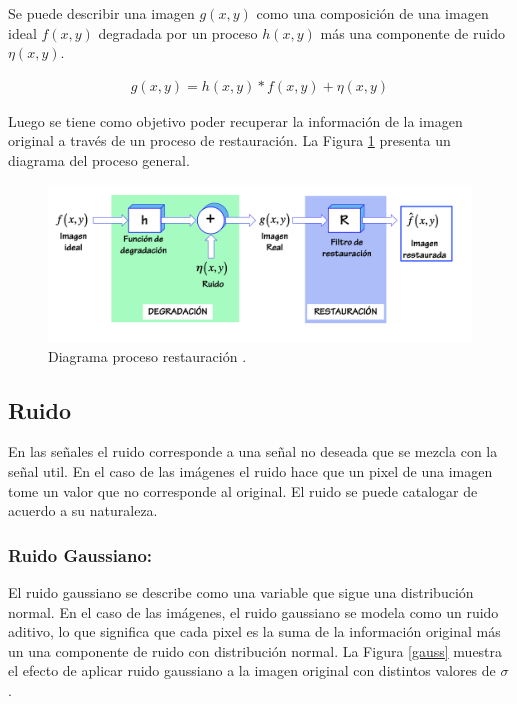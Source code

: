 \documentclass[
  letterpaper,
  twocolumn,
  9pt,
  journal,
  final]{IEEEtran}
\begin{document}
Se puede describir una imagen $g(x,y)$ como una composición de una imagen ideal $f(x,y)$ degradada por un proceso $h(x,y)$ más una componente de ruido $\eta(x,y)$.

\begin{align}
  g(x,y) = h(x, y) * f(x,y) + \eta(x,y)
\end{align}

Luego se tiene como objetivo poder recuperar la información de la imagen original a través de un proceso de restauración. La Figura \ref{restauracion} presenta un diagrama del proceso general.

\begin{figure}[h!]
	\centering
	\includegraphics[width=0.8\linewidth, trim={0cm 0cm 1cm 0cmm}, clip]{other/restauracion.png}
	\caption{Diagrama proceso restauración \cite{carrasco3}.}
	\label{restauracion}
\end{figure}


\subsection{Ruido}

En las señales el ruido corresponde a una señal no deseada que se mezcla con la señal util. En el caso de las imágenes el ruido hace que un pixel de una imagen tome un valor que no corresponde al original. El ruido se puede catalogar de acuerdo a su naturaleza.

\subsubsection{Ruido Gaussiano:}
El ruido gaussiano se describe como una variable que sigue una distribución normal. En el caso de las imágenes, el ruido gaussiano se modela como un ruido aditivo, lo que significa que cada pixel es la suma de la información original más un una componente de ruido con distribución normal. La Figura \ref{gauss} muestra el efecto de aplicar ruido gaussiano a la imagen original con distintos valores de $\sigma$.
\end{document}
